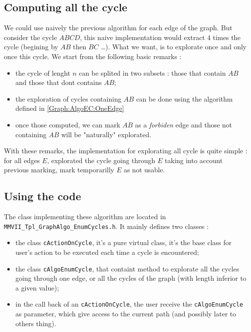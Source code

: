 
\subsection{Computing all the cycle}

\label{Graph:AlgoEC:AllC}

We could use naively the previous algorithm for each edge of the graph. But consider the cycle
$ABCD$, this naive implementation would extract $4$ times the cycle (begining by $AB$ then $BC$ \dots).
What we want, is to explorate once and only once this cycle. We start from the following basic remarks :

\begin{itemize}
   \item the cycle of lenght $n$ can be splited in two subsets : those that contain $AB$ and those
         that dont contains $AB$;

   \item the exploration of cycles containing $AB$ can be done using the algorithm defined in \ref{Graph:AlgoEC:OneEdge}

   \item once those computed, we can mark $AB$ as a \emph{forbiden} edge and those not containing $AB$ will be "naturally"
         explorated.
\end{itemize}

With these remarks,  the implementation for explorating all cycle is quite simple : for all edges $E$, explorated the cycle
going through $E$ taking into account previous marking, mark temporarilly $E$ as not usable.



\subsection{Using the code}

The class implementing these algorithm are located in  {\tt MMVII\_Tpl\_GraphAlgo\_EnumCycles.h}. It mainly
defines two classes :

\begin{itemize}
    \item the class {\tt cActionOnCycle}, it's a pure virtual class, it's the base class for user's action
          to be executed each time a cycle is encountered;

    \item the class {\tt cAlgoEnumCycle}, that containt method to explorate all the cycles going through
          one edge, or all the cycles of the graph  (with length inferior to a given value);

     \item in the call back of an  {\tt cActionOnCycle}, the user receive the {\tt cAlgoEnumCycle} as parameter,
           which give access to the current path (and possibly later to others thing).
\end{itemize}


